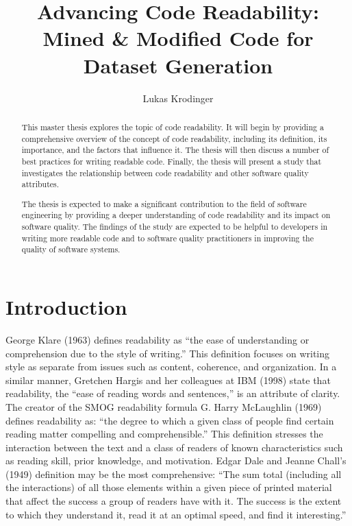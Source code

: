 \documentclass[%
class=scrreprt,
chapterprefix=false,%
open=right,%
twoside=false,%
paper=a4,%
logofile={Logo\_zentral\_farbig\_EN.png},%
thesistype=master,%
UKenglish,%
]{se2thesis}
\author{Lukas Krodinger}
\title{Advancing Code Readability: Mined \& Modified Code for Dataset Generation}
\institute{Chair of Software Engineering II}
\begin{document}
	
	\frontmatter
	
	\maketitle
	
	\begin{abstract}
		This master thesis explores the topic of code readability. It will begin by providing a comprehensive overview of the concept of code readability, including its definition, its importance, and the factors that influence it. The thesis will then discuss a number of best practices for writing readable code. Finally, the thesis will present a study that investigates the relationship between code readability and other software quality attributes.
		
		The thesis is expected to make a significant contribution to the field of software engineering by providing a deeper understanding of code readability and its impact on software quality. The findings of the study are expected to be helpful to developers in writing more readable code and to software quality practitioners in improving the quality of software systems.
	\end{abstract}
	
	\mainmatter
	
	\tableofcontents
	
	\section{Introduction} \label{Introduction}
	
	
	George Klare (1963) defines readability as “the ease of understanding or
	comprehension due to the style of writing.” This definition focuses on writing
	style as separate from issues such as content, coherence, and organization. In a
	similar manner, Gretchen Hargis and her colleagues at IBM (1998) state that
	readability, the “ease of reading words and sentences,” is an attribute of clarity.
	The creator of the SMOG readability formula G. Harry McLaughlin (1969)
	defines readability as: “the degree to which a given class of people find certain
	reading matter compelling and comprehensible.” This definition stresses the
	interaction between the text and a class of readers of known characteristics such
	as reading skill, prior knowledge, and motivation.
	Edgar Dale and Jeanne Chall’s (1949) definition may be the most
	comprehensive: “The sum total (including all the interactions) of all those
	elements within a given piece of printed material that affect the success a group
	of readers have with it. The success is the extent to which they understand it,
	read it at an optimal speed, and find it interesting.” 
	\cite{dubay2004principles}
	
\end{document}
